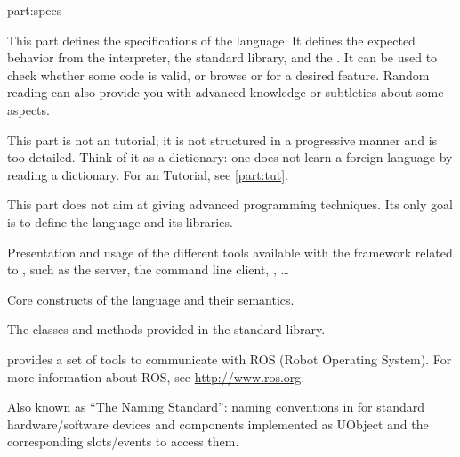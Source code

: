 
\begin{partDescription}{part:specs}
  {
    This part defines the specifications of the \us language. It defines the
    expected behavior from the \us interpreter, the standard library, and
    the \sdk. It can be used to check whether some code is valid, or browse
    \us or \Cxx \api for a desired feature. Random reading can also provide
    you with advanced knowledge or subtleties about some \us aspects.

    This part is not an \us tutorial; it is not structured in a progressive
    manner and is too detailed.  Think of it as a dictionary: one does not
    learn a foreign language by reading a dictionary. For an \us Tutorial,
    see \autoref{part:tut}.

    This part does not aim at giving advanced programming techniques. Its
    only goal is to define the language and its libraries.
  }
\item[sec:tools] Presentation and usage of the different tools available
  with the \urbi framework related to \us, such as the \urbi server, the
  command line client, \umake, \ldots

\item[sec:lang] Core constructs of the language and their semantics.

\item[sec:stdlib] The classes and methods provided in the standard library.

\item[sec:specs:ros] \urbi provides a set of tools to communicate with ROS
  (Robot Operating System).  For more information about ROS, see
  \url{http://www.ros.org}.

\item[sec:naming] Also known as ``The \urbi Naming Standard'': naming
  conventions in for standard hardware/software devices and components
  implemented as UObject and the corresponding slots/events to access them.
\end{partDescription}


